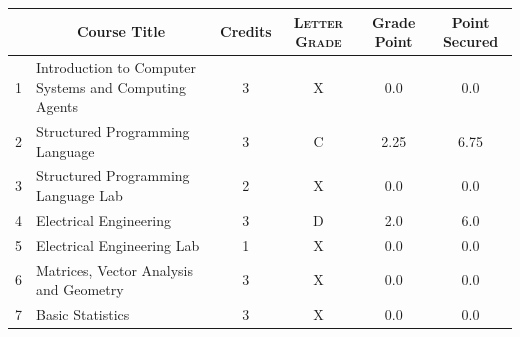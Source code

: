 \documentclass[11pt]{article}
\newcommand*{\numtwo}[1]{\pgfmathprintnumber[
                    fixed, precision=2, fixed zerofill=true]{#1}}
\begin{document}
                \begin{center}
                    \renewcommand{\arraystretch}{1.08}
                    
                \begin{tabular}{|c|l|c|>{\scshape}c|c|c|}
                \hline  \rule[-1ex]{0pt}{3.5ex} {\centering{\bf Course Code}} &  \multicolumn{1}{c|}{\textbf{Course Title}}  & {\bf Credits} & {\bf Letter Grade} & {\bf Grade Point} & {\bf Point Secured}  \\ 
                \hline   1 &  Introduction to Computer Systems and Computing Agents		 & 3 & X & 0.0 & 0.0 \\ %
                \hline   2 &  Structured Programming Language		 & 3 & C & 2.25 & 6.75 \\ %
                \hline   3 &  Structured Programming Language Lab		 & 2 & X & 0.0 & 0.0 \\ %
                \hline   4 &  Electrical Engineering		 & 3 & D & 2.0 & 6.0 \\ %
                \hline   5 &  Electrical Engineering Lab		 & 1 & X & 0.0 & 0.0 \\ %
                \hline   6 &  Matrices, Vector Analysis and Geometry		 & 3 & X & 0.0 & 0.0 \\ %
                \hline   7 &  Basic Statistics		 & 3 & X & 0.0 & 0.0 \\ %

\hline                %
                \end{tabular}
                \end{center}
                \renewcommand{\arraystretch}{1.03}
\end{document}
